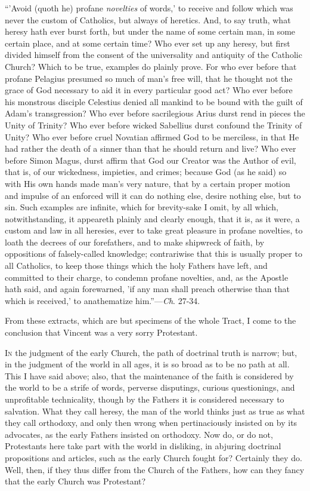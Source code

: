 ``'Avoid (quoth he) profane \emph{novelties} of words,' to
receive and follow which was never the custom of Catholics, but always
of heretics. And, to say truth, what heresy hath ever burst forth, but
under the name of some certain man, in some certain place, and at some
certain time? Who ever set up any heresy, but first divided himself
from the consent of the universality and antiquity of the Catholic
Church? Which to be true, examples do plainly prove. For who ever
before that profane Pelagius presumed so much of man's free will,
that he thought not the grace of God necessary to aid it in every
particular good act? Who ever before his monstrous disciple Celestius
denied all mankind to be bound with the guilt of Adam's
transgression? Who ever before sacrilegious Arius durst rend in pieces
the Unity of Trinity? Who ever before wicked Sabellius durst confound
the Trinity of Unity? Who ever before cruel Novatian affirmed God to
be merciless, in that He had rather the death of a sinner than that he
should return and live? Who ever before Simon Magus, durst affirm that
God our Creator was the Author of evil, that is, of our wickedness,
impieties, and crimes; because God (as he said) so with His own hands
made man's very nature, that by a certain proper motion and impulse
of an enforced will it can do nothing else, desire nothing else, but
to sin. Such examples are infinite, which for brevity-sake I omit, by
all which, notwithstanding, it appeareth plainly and clearly enough,
that it is, as it were, a custom and law in all heresies, ever to take
great pleasure in profane novelties, to loath the decrees of our
forefathers, and to make shipwreck of faith, by oppositions of
falsely-called knowledge; contrariwise that this is usually proper to
all Catholics, to keep those things which the holy Fathers have left,
and committed to their charge, to condemn profane novelties, and, as
the Apostle hath said, and again forewarned, 'if any man shall preach
otherwise than that which is received,' to anathematize him.''—\emph{Ch}.
27-34.

From these extracts, which are but specimens of the whole Tract, I
come to the conclusion that Vincent was a very sorry Protestant.


I\textsc{n} the judgment of the early Church,
the path of doctrinal truth is narrow; but, in the judgment of the
world in all ages, it is so broad as to be no path at all. This I have
said above; also, that the maintenance of the faith is considered by
the world to be a strife of words, perverse disputings, curious
questionings, and unprofitable technicality, though by the Fathers it
is considered necessary to salvation. What they call heresy, the man
of the world thinks just as true as what they call orthodoxy, and only
then wrong when pertinaciously insisted on by its advocates, as the
early Fathers insisted on orthodoxy. Now do, or do not, Protestants
here take part with the world in disliking, in abjuring doctrinal
propositions and articles, such as the early Church fought for?
Certainly they do. Well, then, if they thus differ from the Church of
the Fathers, how can they fancy that the early Church was Protestant?

